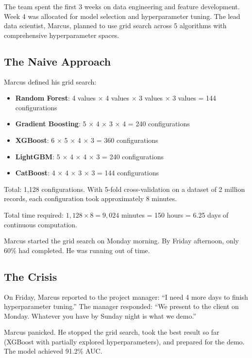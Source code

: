 The team spent the first 3 weeks on data engineering and feature development. Week 4 was allocated for model selection and hyperparameter tuning. The lead data scientist, Marcus, planned to use grid search across 5 algorithms with comprehensive hyperparameter spaces.

\subsection{The Naive Approach}

Marcus defined his grid search:

\begin{itemize}
    \item \textbf{Random Forest}: 4 values $\times$ 4 values $\times$ 3 values $\times$ 3 values = 144 configurations
    \item \textbf{Gradient Boosting}: 5 $\times$ 4 $\times$ 3 $\times$ 4 = 240 configurations
    \item \textbf{XGBoost}: 6 $\times$ 5 $\times$ 4 $\times$ 3 = 360 configurations
    \item \textbf{LightGBM}: 5 $\times$ 4 $\times$ 4 $\times$ 3 = 240 configurations
    \item \textbf{CatBoost}: 4 $\times$ 4 $\times$ 3 $\times$ 3 = 144 configurations
\end{itemize}

Total: 1,128 configurations. With 5-fold cross-validation on a dataset of 2 million records, each configuration took approximately 8 minutes.

Total time required: $1,128 \times 8 = 9,024$ minutes = 150 hours = 6.25 days of continuous computation.

Marcus started the grid search on Monday morning. By Friday afternoon, only 60\% had completed. He was running out of time.

\subsection{The Crisis}

On Friday, Marcus reported to the project manager: ``I need 4 more days to finish hyperparameter tuning.'' The manager responded: ``We present to the client on Monday. Whatever you have by Sunday night is what we demo.''

Marcus panicked. He stopped the grid search, took the best result so far (XGBoost with partially explored hyperparameters), and prepared for the demo. The model achieved 91.2\% AUC.

